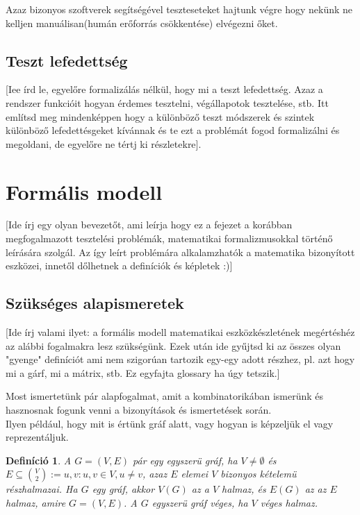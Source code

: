 \documentclass[12pt]{article}
\newtheorem{defin}{Definíció}[section]
\begin{document}
Azaz bizonyos szoftverek segítségével teszteseteket hajtunk végre hogy nekünk ne kelljen manuálisan(humán erőforrás csökkentése) elvégezni őket. 

\subsection{Teszt lefedettség}
[Iee írd le, egyelőre formalizálás nélkül, hogy mi a teszt lefedettség. Azaz a rendszer funkcióit hogyan érdemes tesztelni, végállapotok tesztelése, stb. Itt említsd meg mindenképpen hogy a különböző teszt módszerek és szintek különböző lefedettésgeket kívánnak és te ezt a problémát fogod formalizálni és megoldani, de egyelőre ne tértj ki részletekre].


\section{Formális modell}
[Ide írj egy olyan bevezetőt, ami leírja hogy ez a fejezet a korábban megfogalmazott tesztelési problémák, matematikai formalizmusokkal történő leírására szolgál. Az így leírt problémára alkalamzhatók a matematika bizonyított eszközei, innetől dőlhetnek a definíciók és képletek :)]

\subsection{Szükséges alapismeretek}
[Ide írj valami ilyet: a formális modell matematikai eszközkészletének megértéshéz az alábbi fogalmakra lesz szükségünk. Ezek után ide gyűjtsd ki az összes olyan "gyenge" definíciót ami nem szigorúan tartozik egy-egy adott részhez, pl. azt hogy mi a gárf, mi a mátrix, stb. Ez egyfajta glossary ha úgy tetszik.]

Most ismertetünk pár alapfogalmat, amit a kombinatorikában ismerünk és hasznosnak fogunk venni a bizonyítások és ismertetések során.\\

Ilyen például, hogy mit is értünk gráf alatt, vagy hogyan is képzeljük el vagy reprezentáljuk.

\begin{defin}
A $G = (V,E)$ pár egy egyszerü gráf, ha $V \neq \emptyset$ és $E \subseteq \binom{V}{2} := {{u,v} : u,v \in V, u \neq v}$, azaz $E$ elemei $V$ bizonyos kételemü részhalmazai. Ha $G$ egy gráf, akkor $V(G)$ az a $V$ halmaz, és $E(G)$ az az $E$ halmaz, amire $G = (V,E)$. A $G$ egyszerü gráf véges, ha $V$ véges halmaz. ~\cite{szam:Fleiner}
\end{defin}
\end{document}
